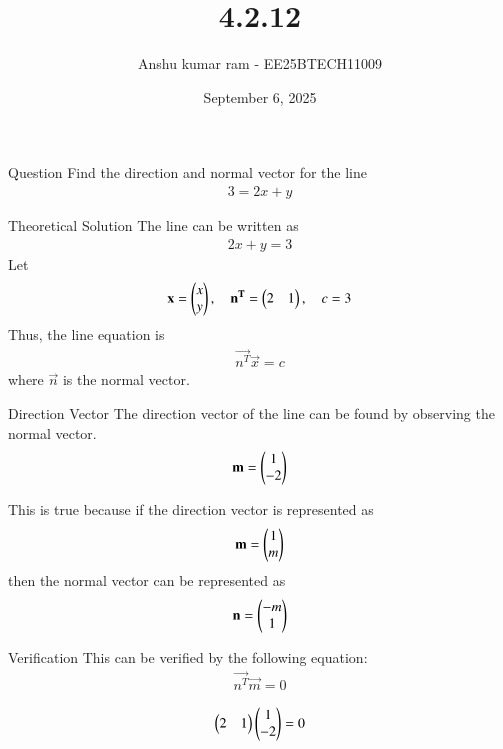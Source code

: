 \documentclass{beamer}
\title %
{4.2.12}
\date{September 6, 2025}
\author {Anshu kumar ram - EE25BTECH11009}
\begin{document}
\frame{\titlepage}

\begin{frame}{Question}
Find the direction and normal vector for the line 
\begin{align}
    3 = 2x + y
\end{align}
\end{frame}

\begin{frame}{Theoretical Solution}
The line can be written as
\begin{align}
    2x + y = 3
\end{align}
Let
\begin{align}
    \mathbf{x} = \begin{pmatrix}x \\ y\end{pmatrix}, \quad
    \mathbf{n^T} = \begin{pmatrix}2 & 1\end{pmatrix}, \quad
    c = 3
\end{align}
Thus, the line equation is
\begin{align}
    \vec{n^T}\vec{x} = c
\end{align}
where $\vec{n}$ is the normal vector.
\end{frame}

\begin{frame}{Direction Vector}
The direction vector of the line can be found by observing the normal vector.
\begin{align}
\mathbf{m} = \begin{pmatrix}1 \\ -2\end{pmatrix}
\end{align}

This is true because if the direction vector is represented as 
\begin{align}
\mathbf{m}  = \begin{pmatrix}1 \\ m\end{pmatrix}    
\end{align}
then the normal vector can be represented as 
\begin{align}
\mathbf{n} = \begin{pmatrix}-m \\ 1\end{pmatrix}
\end{align}
\end{frame}

\begin{frame}{Verification}
This can be verified by the following equation:
\begin{align}
\vec{n^T}\vec{m} = 0
\end{align}

\begin{align}
\begin{pmatrix}2 & 1\end{pmatrix}\begin{pmatrix}1 \\ -2\end{pmatrix} = 0
\end{align}\\    
\end{frame}
\end{document}
